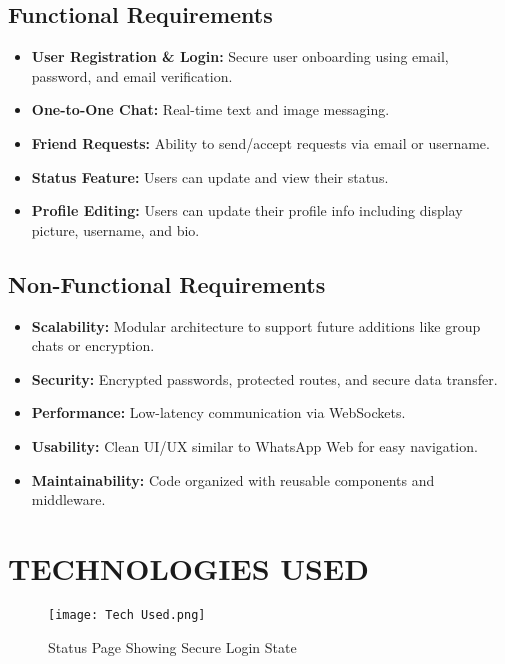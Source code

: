 \documentclass[12pt,a4paper]{report}
\begin{document}
\section{Functional Requirements}
\begin{itemize}
    \item \textbf{User Registration \& Login:} Secure user onboarding using email, password, and email verification.
    \item \textbf{One-to-One Chat:} Real-time text and image messaging.
    \item \textbf{Friend Requests:} Ability to send/accept requests via email or username.
    \item \textbf{Status Feature:} Users can update and view their status.
    \item \textbf{Profile Editing:} Users can update their profile info including display picture, username, and bio.
\end{itemize}

\section{Non-Functional Requirements}
\begin{itemize}
    \item \textbf{Scalability:} Modular architecture to support future additions like group chats or encryption.
    \item \textbf{Security:} Encrypted passwords, protected routes, and secure data transfer.
    \item \textbf{Performance:} Low-latency communication via WebSockets.
    \item \textbf{Usability:} Clean UI/UX similar to WhatsApp Web for easy navigation.
    \item \textbf{Maintainability:} Code organized with reusable components and middleware.
\end{itemize}


\newpage



\chapter{TECHNOLOGIES USED}


\begin{figure}[H]
    \centering
    \texttt{[image: Tech Used.png]}
    \caption{Status Page Showing Secure Login State}
\end{figure}
\end{document}
